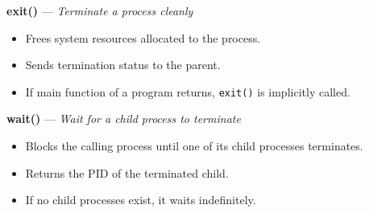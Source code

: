 \documentclass[8pt]{extarticle}
\begin{document}
\begin{minipage}[t]{0.2\textwidth}
 \textbf{exit()} — \textit{Terminate a process cleanly}
    \begin{itemize}[noitemsep,nolistsep,topsep=-10px,partopsep=0pt,parsep=0pt]  
        \item Frees system resources allocated to the process.
        \item Sends termination status to the parent.
        \item If main function of a program returns, \texttt{exit()} is implicitly called.
    \end{itemize}
\end{minipage}
\begin{minipage}[t]{0.21\textwidth}
 \textbf{wait()} — \textit{Wait for a child process to terminate}
    \begin{itemize}[noitemsep,nolistsep,topsep=-10px,partopsep=0pt,parsep=0pt]  
        \item Blocks the calling process until one of its child processes terminates.
        \item Returns the PID of the terminated child.
        \item If no child processes exist, it waits indefinitely.
    \end{itemize}
\end{minipage}
\newpage
\hspace*{-20px}
\end{document}
